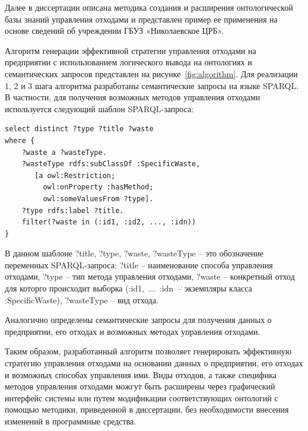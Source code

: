 \documentclass[a4paper]{G2-105}
\begin{document}
Далее в диссертации описана методика создания и расширения онтологической базы знаний управления отходами и представлен пример ее применения на основе сведений об учреждении ГБУЗ «Николаевское ЦРБ».

Алгоритм генерации эффективной стратегии управления отходами на предприятии с использованием логического вывода на онтологиях и семантических запросов представлен на рисунке~\ref{fig:algorithm}. Для реализации 1, 2 и 3 шага алгоритма разработаны семантические запросы на языке SPARQL. В частности, для получения возможных методов управления отходами используется следующий шаблон SPARQL-запроса:
\begin{verbatim}
select distinct ?type ?title ?waste
where {
    ?waste a ?wasteType.
    ?wasteType rdfs:subClassOf :SpecificWaste,
       [a owl:Restriction;
         owl:onProperty :hasMethod;
         owl:someValuesFrom ?type].
    ?type rdfs:label ?title.
    filter(?waste in (:id1, :id2, ..., :idn))
}
\end{verbatim}

В данном шаблоне ?title, ?type, ?waste, ?wasteType -- это обозначение переменных SPARQL-запроса: ?title -- наименование способа управления отходами, ?type -- тип метода управления отходами, ?waste -- конкретный отход для которго происходит выборка (:id1,~...~:idn~-- экземпляры класса :SpecificWaste), ?wasteType -- вид отхода.

Аналогично определены семантические запросы для получения данных о предприятии, его отходах и возможных методах управления отходами.

Таким образом, разработанный алгоритм позволяет генерировать эффективную стратегию управления отходами на основании данных о предприятии, его отходах и возможных способах управления ими. Виды отходов, а также специфика методов управления отходами можгут быть расширены через графический интерфейс системы или путем модификации соответствующих онтологий с помощью методики, приведенной в диссертации, без необходимости внесения изменений в программные средства.
\end{document}
